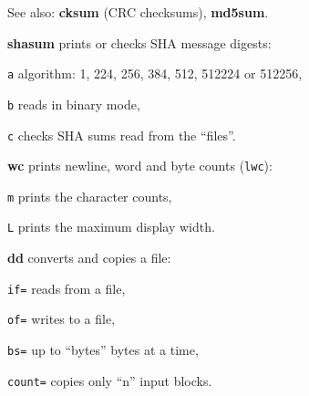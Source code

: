 \begin{compactenum}
	\item [\cmdcore] See also: \textbf{cksum} (CRC checksums), \textbf{md5sum}.
	\item [\cmdcore] \textbf{shasum} prints or checks SHA message digests:
	\item [\texttt{a}] algorithm: 1, 224, 256, 384, 512, 512224 or 512256,
	\item [\texttt{b}] reads in binary mode,
	\item [\texttt{c}] checks SHA sums read from the ``files''.
	\item [\cmdcore] \textbf{wc} prints newline, word and byte counts (\texttt{lwc}):
	\item [\texttt{m}] prints the character counts,
	\item [\texttt{L}] prints the maximum display width.
\end{compactenum}

\begin{compactenum}
	\item [\cmdcore] \textbf{dd} converts and copies a file:
	\item \texttt{if=} reads from a file,
	\item \texttt{of=} writes to a file,
	\item \texttt{bs=} up to ``bytes'' bytes at a time,
	\item \texttt{count=} copies only ``n'' input blocks.
\end{compactenum}

